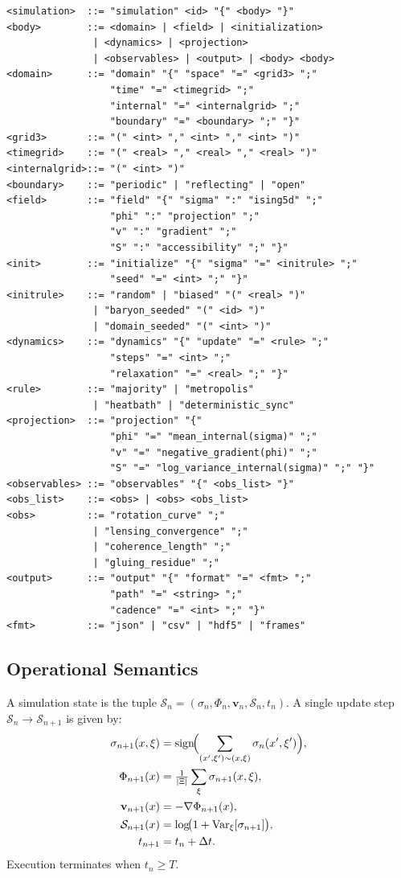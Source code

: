 \documentclass[11pt, a4paper, twocolumn]{article}
\newcommand{\Sfield}{\mathcal{S}}
\begin{document}
{{\footnotesize\begin{verbatim}
<simulation>  ::= "simulation" <id> "{" <body> "}"
<body>        ::= <domain> | <field> | <initialization>
               | <dynamics> | <projection>
               | <observables> | <output> | <body> <body>
<domain>      ::= "domain" "{" "space" "=" <grid3> ";"
                  "time" "=" <timegrid> ";"
                  "internal" "=" <internalgrid> ";"
                  "boundary" "=" <boundary> ";" "}"
<grid3>       ::= "(" <int> "," <int> "," <int> ")"
<timegrid>    ::= "(" <real> "," <real> "," <real> ")"
<internalgrid>::= "(" <int> ")"
<boundary>    ::= "periodic" | "reflecting" | "open"
<field>       ::= "field" "{" "sigma" ":" "ising5d" ";"
                  "phi" ":" "projection" ";"
                  "v" ":" "gradient" ";"
                  "S" ":" "accessibility" ";" "}"
<init>        ::= "initialize" "{" "sigma" "=" <initrule> ";"
                  "seed" "=" <int> ";" "}"
<initrule>    ::= "random" | "biased" "(" <real> ")"
               | "baryon_seeded" "(" <id> ")"
               | "domain_seeded" "(" <int> ")"
<dynamics>    ::= "dynamics" "{" "update" "=" <rule> ";"
                  "steps" "=" <int> ";"
                  "relaxation" "=" <real> ";" "}"
<rule>        ::= "majority" | "metropolis"
               | "heatbath" | "deterministic_sync"
<projection>  ::= "projection" "{"
                  "phi" "=" "mean_internal(sigma)" ";"
                  "v" "=" "negative_gradient(phi)" ";"
                  "S" "=" "log_variance_internal(sigma)" ";" "}"
<observables> ::= "observables" "{" <obs_list> "}"
<obs_list>    ::= <obs> | <obs> <obs_list>
<obs>         ::= "rotation_curve" ";"
               | "lensing_convergence" ";"
               | "coherence_length" ";"
               | "gluing_residue" ";"
<output>      ::= "output" "{" "format" "=" <fmt> ";"
                  "path" "=" <string> ";"
                  "cadence" "=" <int> ";" "}"
<fmt>         ::= "json" | "csv" | "hdf5" | "frames"
\end{verbatim}}

\subsection{Operational Semantics}

A simulation state is the tuple
$\mathcal{S}_n = (\sigma_n,\Phi_n,\mathbf{v}_n,\Sfield_n,t_n)$.
A single update step $\mathcal{S}_n \to \mathcal{S}_{n+1}$ is given by:
\begin{align*}
    \sigma_{n+1}(x,\xi) &= \operatorname{sign}\!\Bigl(\sum_{(x',\xi')\sim(x,\xi)}\sigma_n(x',\xi')\Bigr), \\
    \Phi_{n+1}(x) &= \tfrac{1}{|\Xi|}\sum_\xi \sigma_{n+1}(x,\xi), \\
    \mathbf{v}_{n+1}(x) &= -\nabla\Phi_{n+1}(x), \\
    \Sfield_{n+1}(x) &= \log\!\bigl(1 + \operatorname{Var}_\xi[\sigma_{n+1}]\bigr), \\
    t_{n+1} &= t_n + \Delta t.
\end{align*}
Execution terminates when $t_n \geq T$.

}
\end{document}
